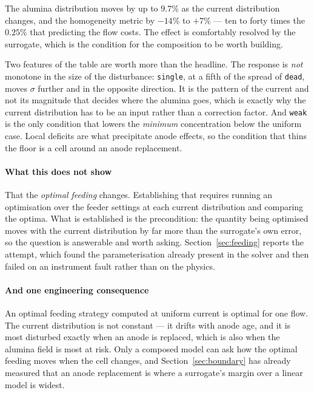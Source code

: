 \documentclass[11pt,a4paper]{article}
\theoremstyle{plain}
\theoremstyle{definition}
\theoremstyle{remark}
\begin{document}
The alumina distribution moves by up to $9.7\%$ as the current distribution
changes, and the homogeneity metric by $-14\%$ to $+7\%$ --- ten to forty times
the $0.25\%$ that predicting the flow costs. The effect is comfortably resolved
by the surrogate, which is the condition for the composition to be worth
building.

Two features of the table are worth more than the headline. The response is
\emph{not} monotone in the size of the disturbance: \texttt{single}, at a fifth
of the spread of \texttt{dead}, moves $\sigma$ further and in the opposite
direction. It is the pattern of the current and not its magnitude that decides
where the alumina goes, which is exactly why the current distribution has to be
an input rather than a correction factor. And \texttt{weak} is the only condition
that lowers the \emph{minimum} concentration below the uniform case. Local
deficits are what precipitate anode effects, so the condition that thins the
floor is a cell around an anode replacement.

\paragraph{What this does not show}
That the \emph{optimal feeding} changes. Establishing that requires running an
optimisation over the feeder settings at each current distribution and comparing
the optima. What is established is the precondition: the quantity being optimised
moves with the current distribution by far more than the surrogate's own error,
so the question is answerable and worth asking. Section~\ref{sec:feeding} reports
the attempt, which found the parameterisation already present in the solver and
then failed on an instrument fault rather than on the physics.

\paragraph{And one engineering consequence}
An optimal feeding strategy computed at uniform current is optimal for one flow.
The current distribution is not constant --- it drifts with anode age, and it is
most disturbed exactly when an anode is replaced, which is also when the alumina
field is most at risk. Only a composed model can ask how the optimal feeding
moves when the cell changes, and Section~\ref{sec:boundary} has already measured
that an anode replacement is where a surrogate's margin over a linear model is
widest.


\end{document}
